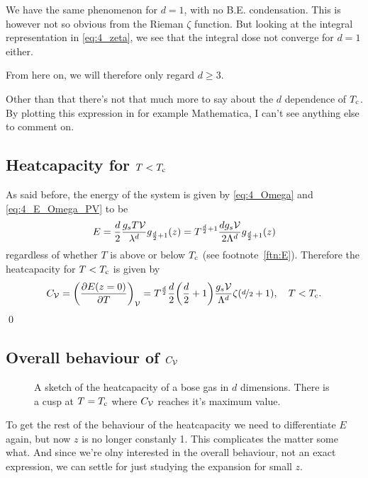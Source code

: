 \documentclass[11pt,letter, swedish, english
]{article}
\begin{document}
We have the same phenomenon for $d=1$, with no B.E. condensation. This
is however not so obvious from the Rieman $\zeta$ function. But
looking at the integral representation in \eqref{eq:4_zeta}, we see
that the integral dose not converge for $d=1$ either. 

From here on, we will therefore only regard $d\ge3$.

Other than that there's not that much more to say about the $d$
dependence of $T_{\text{c}}$. By plotting this expression in for example
Mathematica, I can't see anything else to comment on. 


\subsection{Heatcapacity for $T<T_{\text{c}}$}
\newcommand{\Kd}{\ensuremath{\mathcal{K}_d}}
As said before, the energy of the system is given by
\eqref{eq:4_Omega} and \eqref{eq:4_E_Omega_PV} to be
\begin{equation}
E=\frac{d}{2}\frac{g_sT\mathcal{V}}{\lambda^d}g_{\frac{d}{2}+1}(z)
=T^{\frac{d}{2}+1}\frac{d g_s\mathcal{V}}{2\Lambda^d}g_{\frac{d}{2}+1}(z)
\end{equation}
regardless of whether $T$ is above or below $T_{\text{c}}$ (see
footnote~\ref{ftn:E}). Therefore the heatcapacity for $T<T_{\text{c}}$ is given by
\begin{equation}\label{eq:4b_Cv}
C_\V=\qty(\pdv{E(z=0)}{T})_\V
=T^{\D{2}}\frac{d}{2}\qty(\D{2}+1)\frac{g_s\V}{\Lambda^d}\zeta(\nD{2}+1)
\qcomma T<\Tc.
\end{equation}
\qed


\subsection{Overall behaviour of $C_{\mathcal{V}}$}
\begin{figure}\centering
\resizebox{.5\textwidth}{!}{}
\caption{A sketch of the heatcapacity of a bose gas in $d$
  dimensions. There is a cusp at $T=T_{\text{c}}$ where $C_{\mathcal{V}}$ reaches it's
  maximum value. }
\label{fig:Cv}
\end{figure}

To get the rest of the behaviour of the heatcapacity we need to
differentiate $E$ again, but now $z$ is no longer constanly 1. This
complicates the matter some what. And since we're olny interested in
the overall behaviour, not an exact expression, we can settle for just
studying the expansion for small  $z$.
\end{document}

